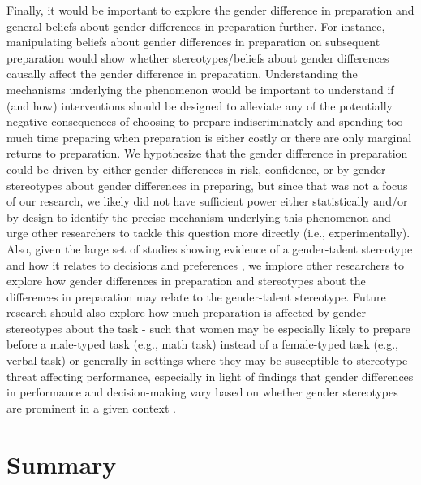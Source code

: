 \documentclass[letterpaper, nobind]{templates/ociamthesis}
\begin{document}
Finally, it would be important to explore the gender difference in preparation and general beliefs about gender differences in preparation further. For instance, manipulating beliefs about gender differences in preparation on subsequent preparation would show whether stereotypes/beliefs about gender differences causally affect the gender difference in preparation. Understanding the mechanisms underlying the phenomenon would be important to understand if (and how) interventions should be designed to alleviate any of the potentially negative consequences of choosing to prepare indiscriminately and spending too much time preparing when preparation is either costly or there are only marginal returns to preparation. We hypothesize that the gender difference in preparation could be driven by either gender differences in risk, confidence, or by gender stereotypes about gender differences in preparing, but since that was not a focus of our research, we likely did not have sufficient power either statistically and/or by design to identify the precise mechanism underlying this phenomenon and urge other researchers to tackle this question more directly (i.e., experimentally). Also, given the large set of studies showing evidence of a gender-talent stereotype and how it relates to decisions and preferences \autocite{Napp2022,Bian2017,Bian2017a,Leslie2015,Meyer2015,Bian2018,Storage2020}, we implore other researchers to explore how gender differences in preparation and stereotypes about the differences in preparation may relate to the gender-talent stereotype. Future research should also explore how much preparation is affected by gender stereotypes about the task - such that women may be especially likely to prepare before a male-typed task (e.g., math task) instead of a female-typed task (e.g., verbal task) or generally in settings where they may be susceptible to stereotype threat affecting performance, especially in light of findings that gender differences in performance and decision-making vary based on whether gender stereotypes are prominent in a given context \autocite{Gneezy2003,Shurchkov2012,Apicella2015,Niederle2011}.

\hypertarget{summary-4}{%
\section{Summary}\label{summary-4}}
\end{document}
